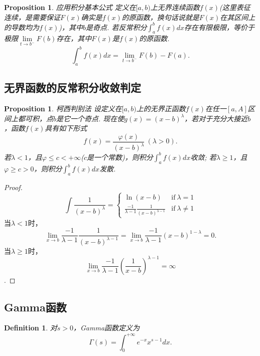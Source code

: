 \documentclass{article}
\newtheorem{proposition}[theorem]{Proposition}
\newtheorem{definition}[theorem]{Definition}
\begin{document}
\begin{proposition}
\rm {\color{red} 应用积分基本公式} 定义在$[a,b)$上无界连续函数$f(x)$({\color{blue}这里表征连续，是需要保证$F(x)$确实是$f(x)$的原函数，换句话说就是$F(x)$在其区间上的导数均为$f(x)$})，其中$b$是奇点. 若反常积分$\int_a^b f(x)dx$存在有限极限，等价于极限$\lim\limits_{t \rightarrow b^-}F(b)$存在，其中$F(x)$是$f(x)$的原函数. 
$$
\int_a^b f(x)dx = \lim\limits_{t \rightarrow b^-}F(b)-F(a).
$$
\end{proposition}

\subsection{无界函数的反常积分收敛判定}

\begin{proposition}
\rm {\color{red} 柯西判别法} 设定义在$[a,b)$上的无界正函数$f(x)$在任一$[a,A]$区间上都可积，点$b$是它一个奇点. 现在使$g(x)=(x-b)^\lambda$，若对于充分大接近$b$，函数$f(x)$具有如下形式
$$
f(x) = \frac{\varphi(x)}{(x-b)^\lambda}~(\lambda > 0).
$$
若$\lambda < 1$，且$\varphi \leq c < +\infty$($c$是一个常数)，则积分$\int_a^b f(x)dx$收敛; 若$\lambda \geq 1$，且$\varphi \geq c > 0$，则积分$\int_a^b f(x)dx$发散.
\end{proposition}

\begin{proof}
$$
\int \frac{1}{(x-b)^\lambda} = \left\{ \begin{array}{ll}
\ln(x-b) & \text{if}~\lambda = 1\\
\frac{-1}{\lambda-1}\frac{1}{(x-b)^{\lambda-1}} & \text{if}~\lambda \neq 1
\end{array} \right.
$$
当$\lambda < 1$时，
$$
\lim\limits_{x \rightarrow b} \frac{-1}{\lambda-1}\frac{1}{(x-b)^{\lambda-1}} = \lim\limits_{x \rightarrow b} \frac{-1}{\lambda-1}{(x-b)^{1-\lambda}} = 0. 
$$
当$\lambda \geq 1$时，
$$
\lim\limits_{x \rightarrow b} \frac{-1}{\lambda-1}\left(\frac{1}{x-b}\right)^{\lambda-1} = \infty
$$.
\end{proof}

\subsection{Gamma函数}

\begin{definition}
\rm 对$s > 0$，Gamma函数定义为
$$
\Gamma(s) = \int_0^{+\infty} e^{-x}x^{s-1}dx.
$$
\begin{center}
\end{center}
\end{definition}
\end{document}
